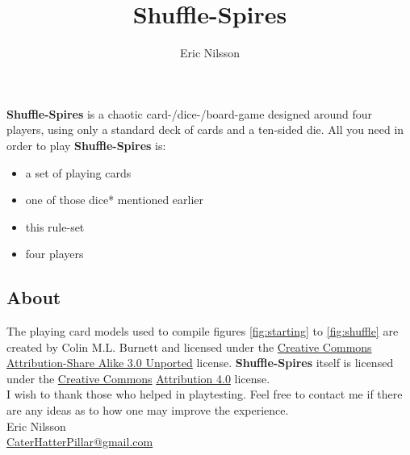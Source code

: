 \documentclass[11pt,twocolumn]{article}
\title{Shuffle-Spires}
\author{Eric Nilsson}
\date{}
\begin{document}
\maketitle

\noindent
\textbf{Shuffle-Spires} is a chaotic card-/dice-/board-game designed around four players, using only a standard deck of cards and a ten-sided die.
All you need in order to play \textbf{Shuffle-Spires} is:
\begin{itemize}[noitemsep]
\renewcommand{\labelitemi}{$\bullet$}
\item a set of playing cards
\item one of those dice* mentioned earlier
\item this rule-set
\item four players
\end{itemize}






\subsection{About}
\label{sec:about}
The playing card models used to compile figures \ref{fig:starting} to \ref{fig:shuffle} are created by Colin M.L. Burnett and licensed under the \href{http://en.wikipedia.org/wiki/en:Creative_Commons}{Creative Commons} \href{http://creativecommons.org/licenses/by-sa/3.0/deed.en}{Attribution-Share Alike 3.0 Unported} license.
\textbf{Shuffle-Spires} itself is licensed under the \href{http://en.wikipedia.org/wiki/en:Creative_Commons}{Creative Commons} \href{http://creativecommons.org/licenses/by/4.0/}{Attribution 4.0} license.\\

\noindent
I wish to thank those who helped in playtesting.
Feel free to contact me if there are any ideas as to how one may improve the experience.\\

\noindent
Eric Nilsson \\
\href{mailto:CaterHatterPillar@gmail.com}{CaterHatterPillar@gmail.com}
\end{document}
